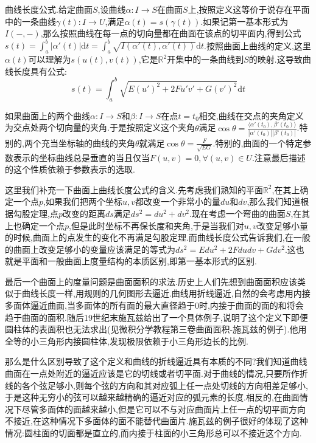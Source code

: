 曲线长度公式.给定曲面$S$,设曲线$\alpha:I\to S$在曲面$S$上,按照定义这等价于说存在平面中的一条曲线$\gamma(t):I\to U$,满足$\alpha(t)=s(\gamma(t))$.如果记第一基本形式为$I(-,-)$,那么按照曲线在每一点的切向量都在曲面在该点的切平面内,得到公式$s(t)=\int_a^b|\alpha'(t)|\mathrm{d}t=\int_a^b\sqrt{I(\alpha'(t),\alpha'(t))}\mathrm{d}t$.按照曲面上曲线的定义,这里$\alpha(t)$可以理解为$s(u(t),v(t))$,它是$\mathbb{R}^2$开集中的一条曲线到$S$的映射.这导致曲线长度具有公式:
$$s(t)=\int_a^b\sqrt{E(u')^2+2Fu'v'+G(v')^2}\mathrm{d}t$$

如果曲面上的两个曲线$\alpha:I\to S$和$\beta:I\to S$在点$t=t_0$相交,曲线在交点的夹角定义为交点处两个切向量的夹角.于是按照定义这个夹角$\theta$满足$\cos\theta=\frac{\langle \alpha'(t_0),\beta'(t_0)\rangle}{|\alpha'(t_0)||\beta'(t_0)|}$.特别的,两个充当坐标轴的曲线的夹角$\theta$就满足$\cos\theta=\frac{F}{\sqrt{EG}}$.特别的,曲面的一个特定参数表示的坐标曲线总是垂直的当且仅当$F(u,v)=0,\forall (u,v)\in U$.注意最后描述的这个性质依赖于参数表示的选取.

这里我们补充一下曲面上曲线长度公式的含义.先考虑我们熟知的平面$\mathbb{R}^2$,在其上确定一个点$p$,如果我们把两个坐标$u,v$都改变一个非常小的量$du$和$dv$,那么我们知道根据勾股定理,点$p$改变的距离$ds$满足$ds^2=du^2+dv^2$.现在考虑一个弯曲的曲面$S$,在其上也确定一个点$p$,但是此时坐标不再保长度和夹角,于是当我们对$u,v$改变足够小量的时候,曲面上的点发生的变化不再满足勾股定理.而曲线长度公式告诉我们,在一般的曲面上改变足够小的变量应该满足的等式为$ds^2=Edu^2+2Fdudv+Gdv^2$.这也就是平面和一般曲面上度量结构的本质区别,即第一基本形式的区别.

最后一个曲面上的度量问题是曲面面积的求法.历史上人们先想到曲面面积应该类似于曲线长度一样,用规则的几何图形去逼近.曲线用折线逼近,自然的会考虑用内接多面体逼近曲面,当多面体的所有面的最大直径趋于0时,内接于曲面的面的和将会趋于曲面的面积.随后19世纪末施瓦兹给出了一个具体例子,说明了这个定义下即便圆柱体的表面积也无法求出(见微积分学教程第三卷曲面面积-施瓦兹的例子).他用全等的小三角形内接圆柱体,发现极限依赖于小三角形边长的比例.

那么是什么区别导致了这个定义和曲线的折线逼近具有本质的不同?我们知道曲线曲面在一点处附近的逼近应该是它的切线或者切平面.对于曲线的情况,只要所作折线的各个弦足够小,则每个弦的方向和其对应弧上任一点处切线的方向相差足够小,于是这种无穷小的弦可以越来越精确的逼近对应的弧元素的长度.相反的,在曲面情况下尽管多面体的面越来越小,但是它可以不与对应曲面片上任一点的切平面方向不接近,在这种情况下多面体的面不能替代曲面片.施瓦兹的例子很好的体现了这种情况:圆柱面的切面都是直立的,而内接于柱面的小三角形总可以不接近这个方向.

